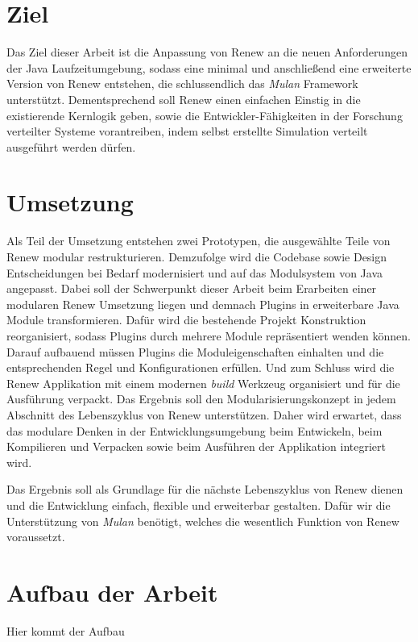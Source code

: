 \section{Ziel} \label{sec:Z}

Das Ziel dieser Arbeit ist die Anpassung von Renew an die neuen Anforderungen der Java Laufzeitumgebung, sodass eine minimal und anschließend eine  erweiterte Version von Renew entstehen, die schlussendlich das \textit{Mulan} Framework unterstützt. Dementsprechend soll Renew einen einfachen Einstig in die existierende Kernlogik geben, sowie die Entwickler-Fähigkeiten in der Forschung verteilter Systeme vorantreiben, indem selbst erstellte Simulation verteilt ausgeführt werden dürfen.

\section{Umsetzung} \label{sec:U}

Als Teil der Umsetzung entstehen zwei Prototypen, die ausgewählte Teile von Renew modular restrukturieren. Demzufolge wird die Codebase sowie Design Entscheidungen bei Bedarf modernisiert und auf das Modulsystem von Java angepasst. Dabei soll der Schwerpunkt dieser Arbeit beim Erarbeiten einer modularen Renew Umsetzung liegen und demnach Plugins in erweiterbare Java Module transformieren.\newline
Dafür wird die bestehende Projekt Konstruktion reorganisiert, sodass Plugins durch mehrere Module repräsentiert wenden können. Darauf aufbauend müssen Plugins die Moduleigenschaften einhalten und die entsprechenden Regel und Konfigurationen erfüllen. Und zum Schluss wird die Renew Applikation mit einem modernen \textit{build} Werkzeug organisiert und für die Ausführung verpackt.\newline
Das Ergebnis soll den Modularisierungskonzept in jedem Abschnitt des Lebenszyklus von Renew unterstützen. Daher wird erwartet, dass das modulare Denken in der Entwicklungsumgebung beim Entwickeln, beim Kompilieren und Verpacken sowie beim Ausführen der Applikation integriert wird. \bigbreak

Das Ergebnis soll als Grundlage für die nächste Lebenszyklus von Renew dienen und die Entwicklung einfach, flexible und erweiterbar gestalten. Dafür wir die Unterstützung von \textit{Mulan} benötigt, welches die wesentlich Funktion von Renew voraussetzt. 

\section{Aufbau der Arbeit} \label{sec:AdA}
Hier kommt der Aufbau 

